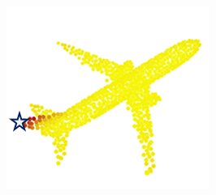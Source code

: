 \documentclass[letterpaper]{article}
\begin{document}
\begin{figure}[htbp]
\begin{center}
\begin{minipage}[b]{0.8\linewidth}
\begin{center}
\begin{minipage}[b]{0.12\linewidth}
\begin{center}
\end{center}
\end{minipage}\\
\begin{minipage}[b]{0.15\linewidth}
\begin{center}
\end{center}
\end{minipage}
\begin{minipage}[b]{0.12\linewidth}
\begin{center}
\includegraphics[width=1.0\linewidth]{images/atten_pic/airplane_feature_1.png}
\end{center}
\end{minipage}
\begin{minipage}[b]{0.12\linewidth}
\begin{center}

\end{center}
\end{minipage}
\end{center}
\end{minipage}
\end{center}
\end{figure}
\end{document}
